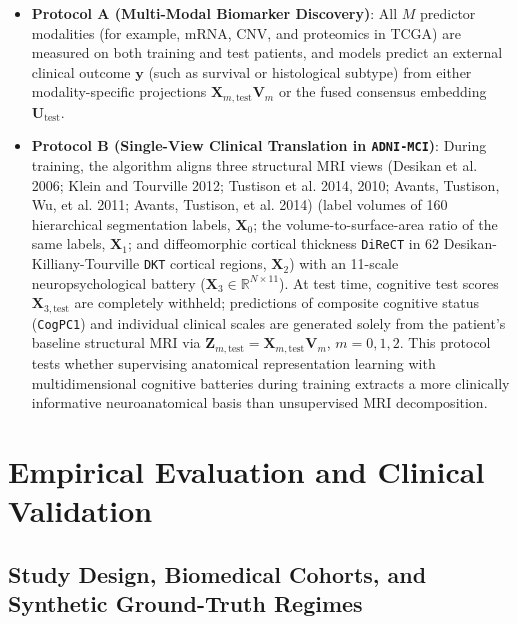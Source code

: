 \documentclass[
  10pt,
  letterpaper,
]{report}
\providecommand{\tightlist}{%
  \setlength{\itemsep}{0pt}\setlength{\parskip}{0pt}}
\begin{document}
\begin{itemize}
\tightlist
\item
  \textbf{Protocol A (Multi-Modal Biomarker Discovery)}: All \(M\)
  predictor modalities (for example, mRNA, CNV, and proteomics in TCGA)
  are measured on both training and test patients, and models predict an
  external clinical outcome \(\mathbf{y}\) (such as survival or
  histological subtype) from either modality-specific projections
  \(\mathbf{X}_{m,\text{test}}\mathbf{V}_m\) or the fused consensus
  embedding \(\mathbf{U}_{\text{test}}\).
\item
  \textbf{Protocol B (Single-View Clinical Translation in
  \texttt{ADNI-MCI})}: During training, the algorithm aligns three
  structural MRI views (Desikan et al. 2006; Klein and Tourville 2012;
  Tustison et al. 2014, 2010; Avants, Tustison, Wu, et al. 2011; Avants,
  Tustison, et al. 2014) (label volumes of 160 hierarchical segmentation
  labels, \(\mathbf{X}_0\); the volume-to-surface-area ratio of the same
  labels, \(\mathbf{X}_1\); and diffeomorphic cortical thickness
  \texttt{DiReCT} in 62 Desikan-Killiany-Tourville \texttt{DKT} cortical
  regions, \(\mathbf{X}_2\)) with an 11-scale neuropsychological battery
  (\(\mathbf{X}_3 \in \mathbb{R}^{N \times 11}\)). At test time,
  cognitive test scores \(\mathbf{X}_{3,\text{test}}\) are completely
  withheld; predictions of composite cognitive status (\texttt{CogPC1})
  and individual clinical scales are generated solely from the patient's
  baseline structural MRI via
  \(\mathbf{Z}_{m,\text{test}} = \mathbf{X}_{m,\text{test}} \mathbf{V}_m\),
  \(m = 0, 1, 2\). This protocol tests whether supervising anatomical
  representation learning with multidimensional cognitive batteries
  during training extracts a more clinically informative neuroanatomical
  basis than unsupervised MRI decomposition.
\end{itemize}


\chapter{Empirical Evaluation and Clinical
Validation}\label{empirical-evaluation-and-clinical-validation}

\section{Study Design, Biomedical Cohorts, and Synthetic Ground-Truth
Regimes}\label{study-design-biomedical-cohorts-and-synthetic-ground-truth-regimes}
\end{document}
